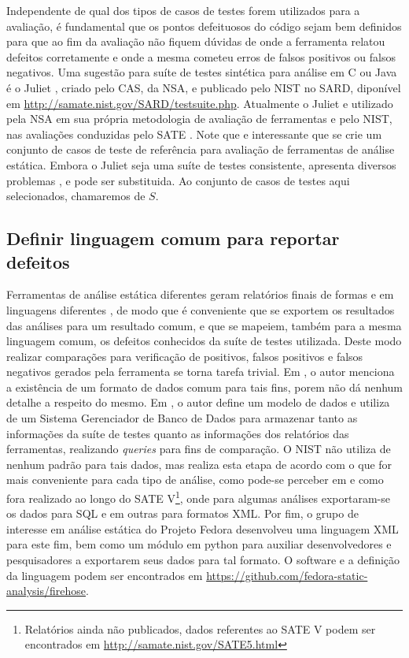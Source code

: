 Independente de qual dos tipos de casos de testes forem utilizados para a avaliação, é fundamental que os pontos defeituosos do código sejam bem definidos para que ao fim da avaliação não fiquem dúvidas de onde a ferramenta relatou defeitos corretamente e onde a mesma cometeu erros de falsos positivos ou falsos negativos.
Uma sugestão para suíte de testes sintética para análise em C ou Java é o Juliet \cite{juliet}, criado pelo CAS, da NSA, e publicado pelo NIST no SARD, diponível em \url{http://samate.nist.gov/SARD/testsuite.php}. Atualmente o Juliet e utilizado pela NSA em sua própria metodologia de avaliação de ferramentas \cite{nsa} e pelo NIST, nas avaliações conduzidas pelo SATE \cite{sate_iv}. Note que e interessante que se crie um conjunto de casos de teste de referência para avaliação de ferramentas de análise estática. Embora o Juliet seja uma suíte de testes consistente, apresenta diversos problemas  \cite{pascal}, \cite{juliet} e pode ser substituida.
Ao conjunto de casos de testes aqui selecionados, chamaremos de $S$.

\subsection{Definir linguagem comum para reportar defeitos}

Ferramentas de análise estática diferentes geram relatórios finais de formas e em linguagens diferentes \cite{nsa}, de modo que é conveniente que se exportem os resultados das análises para um resultado comum, e que se mapeiem, também para a mesma linguagem comum, os defeitos conhecidos da suíte de testes utilizada. Deste modo realizar comparações para verificação de positivos, falsos positivos e falsos negativos gerados pela ferramenta se torna tarefa trivial. Em \cite{nsa}, o autor menciona a existência de um formato de dados comum para tais fins, porem não dá nenhum detalhe a respeito do mesmo. Em \cite{harvard}, o autor define um modelo de dados e utiliza de um Sistema Gerenciador de Banco de Dados para armazenar tanto as informações da suíte de testes quanto as informações dos relatórios das ferramentas, realizando \textit{queries} para fins de comparação. O NIST não utiliza de nenhum padrão para tais dados, mas realiza esta etapa de acordo com o que for mais conveniente para cada tipo de análise, como pode-se perceber em \cite{sate_iv} e como fora realizado ao longo do SATE V\footnote{Relatórios ainda não publicados, dados referentes ao SATE V podem ser encontrados em \url{http://samate.nist.gov/SATE5.html}}, onde para algumas análises exportaram-se os dados para SQL e em outras para formatos XML. Por fim, o grupo de interesse em análise estática do Projeto Fedora desenvolveu uma linguagem XML para este fim, bem como um módulo em python para auxiliar desenvolvedores e pesquisadores a exportarem seus dados para tal formato. O software e a definição da linguagem podem ser encontrados em \url{https://github.com/fedora-static-analysis/firehose}.

